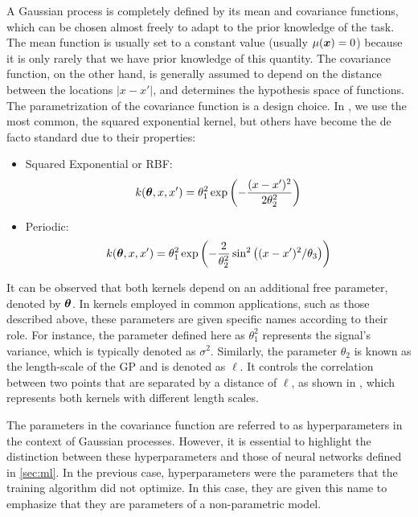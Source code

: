 
A Gaussian process is completely defined by its mean and covariance functions, which can be chosen almost freely to adapt to the prior knowledge of the task. The mean function is usually set to a constant value (usually $\mu(\boldsymbol{x}) = 0$) because it is only rarely that we have prior knowledge of this quantity. The covariance function, on the other hand, is generally assumed to depend on the distance between the locations $|x-x'|$, and determines the hypothesis space of functions. The parametrization of the covariance function is a design choice. In , we use the most common, the squared exponential kernel, but others have become the de facto standard due to their properties:
\begin{itemize}
    \item Squared Exponential or RBF:
    \begin{equation*}
        k(\boldsymbol{\theta}, x, x')=\theta_1^2\exp \left(-\dfrac{(x-x')^2}{2\theta_2^2}\right)
    \end{equation*}
    \item Periodic: 
    \begin{equation*}
        k(\boldsymbol{\theta}, x,x')=\theta_1^2\exp \left(-{\dfrac{2}{\theta_2^{2}}}\sin ^{2}\left((x-x')^2/\theta_3\right)\right)
    \end{equation*}
\end{itemize}
It can be observed that both kernels depend on an additional free parameter, denoted by $\boldsymbol{\theta}$. In kernels employed in common applications, such as those described above, these parameters are given specific names according to their role. For instance, the parameter defined here as $\theta_1^2$ represents the signal's variance, which is typically denoted as $\sigma^2$. Similarly, the parameter $\theta_2$ is known as the length-scale of the GP and is denoted as $\ell$. It controls the correlation between two points that are separated by a distance of $\ell$, as shown in , which represents both kernels with different length scales.

The parameters in the covariance function are referred to as hyperparameters in the context of Gaussian processes. However, it is essential to highlight the distinction between these hyperparameters and those of neural networks defined in \cref{sec:ml}. In the previous case, hyperparameters were the parameters that the training algorithm did not optimize. In this case, they are given this name to emphasize that they are parameters of a non-parametric model. %

